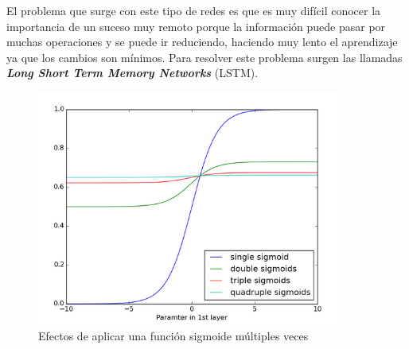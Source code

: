 \documentclass[12pt,spanish]{article}
\begin{document}
	El problema que surge con este tipo de redes es que es muy difícil conocer la importancia de un suceso muy remoto porque la información puede pasar por muchas operaciones y se puede ir reduciendo, haciendo muy lento el aprendizaje ya que los cambios son mínimos. Para resolver este problema surgen las llamadas \textbf{\textit{Long Short Term Memory Networks}} (LSTM).
	\begin{figure}[H]
		\centering
		\includegraphics[width=10cm]{Imagenes/sigmoid_vanishing_gradient.png}
		\begin{centering}
			\caption{Efectos de aplicar una función sigmoide múltiples veces}
		\end{centering}
	\end{figure}
\end{document}
